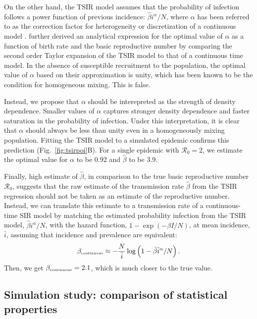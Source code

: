 \documentclass{article}
\newcommand{\fref}[1]{Fig.~\ref{fig:#1}}
\newcommand{\tsub}[2]{#1_{{\textrm{\tiny #2}}}}
\begin{document}
On the other hand, the TSIR model assumes that the probability of infection follows a power function of previous incidence: $\hat{\beta} i^\alpha/N$, where $\alpha$ has been referred to as the correction factor for heterogeneity or discretization of a continuous model \citep{glass2003interpreting}.
\cite{glass2003interpreting} further derived an analytical expression for the optimal value of $\alpha$ as a function of birth rate and the basic reproductive number by comparing the second order Taylor expansion of the TSIR model to that of a continuous time model.
In the absence of susceptible recruitment to the population, the optimal value of $\alpha$ based on their approximation is unity, which has been known to be the condition for homogeneous mixing.
This is false.

Instead, we propose that $\alpha$ should be interepreted as the strength of density dependence.
Smaller values of $\alpha$ captures stronger density dependence and faster saturation in the probability of infection.	
Under this interpretation, it is clear that $\alpha$ should always be less than unity even in a homogeneously mixing population.
Fitting the TSIR model to a simulated epidemic confirms this prediction (\fref{tsirpoi}B).
For a single epidemic with $\mathcal R_0 = 2$, we estimate the optimal value for $\alpha$ to be 0.92 and $\hat{\beta}$ to be 3.9.

Finally, high estimate of $\hat{\beta}$, in comparison to the true basic reproductive number $\mathcal R_0$, suggests that the raw estimate of the transmission rate $\hat{\beta}$ from the TSIR regression should not be taken as an estimate of the reproductive number.
Instead, we can translate this estimate to a transmission rate of a continuous-time SIR model by matching the estimated probability infection from the TSIR model, $\hat{\beta} i^\alpha/N$, with the hazard function, $1 - \exp(-\beta I/N)$, at mean incidence, $\bar{i}$, assuming that incidence and prevalence are equivalent:
\begin{equation}
\tsub{\beta}{continuous} \approx - \frac{N}{\bar{i}} \log \left(1 - \hat{\beta} \bar{i}^\alpha/N \right).
\end{equation}
Then, we get $\tsub{\beta}{continuous} = 2.1$, which is much closer to the true value.

\subsection{Simulation study: comparison of statistical properties}
\end{document}
